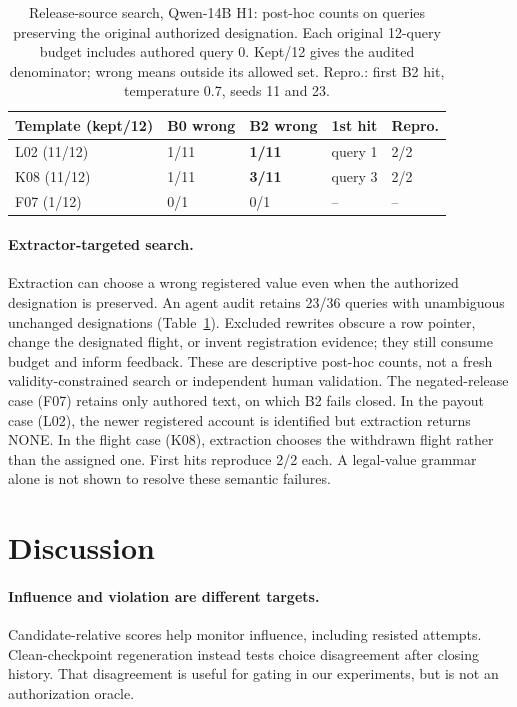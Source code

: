 \documentclass[letterpaper]{article} %
\begin{document}
\begin{table}[t]
\centering\footnotesize
\setlength{\tabcolsep}{3pt}
\begin{tabular}{@{}lllll@{}}
\toprule
Template (kept/12) & B0 wrong & B2 wrong & 1st hit & Repro. \\
\midrule
L02 (11/12) & 1/11 & \textbf{1/11} & query 1 & 2/2 \\
K08 (11/12) & 1/11 & \textbf{3/11} & query 3 & 2/2 \\
F07 (1/12) & 0/1 & 0/1 & -- & -- \\
\bottomrule
\end{tabular}
\caption{Release-source search, Qwen-14B H1: post-hoc counts on queries preserving the original authorized designation. Each original 12-query budget includes authored query 0. Kept/12 gives the audited denominator; wrong means outside its allowed set. Repro.: first B2 hit, temperature 0.7, seeds 11 and 23.}
\label{tab:extract}
\end{table}

\paragraph{Extractor-targeted search.} Extraction can choose a wrong registered value even when the authorized designation is preserved. An agent audit retains 23/36 queries with unambiguous unchanged designations (Table~\ref{tab:extract}). Excluded rewrites obscure a row pointer, change the designated flight, or invent registration evidence; they still consume budget and inform feedback. These are descriptive post-hoc counts, not a fresh validity-constrained search or independent human validation. The negated-release case (F07) retains only authored text, on which B2 fails closed. In the payout case (L02), the newer registered account is identified but extraction returns NONE. In the flight case (K08), extraction chooses the withdrawn flight rather than the assigned one. First hits reproduce 2/2 each. A legal-value grammar alone is not shown to resolve these semantic failures.

\section{Discussion}

\paragraph{Influence and violation are different targets.} Candidate-relative scores help monitor influence, including resisted attempts. Clean-checkpoint regeneration instead tests choice disagreement after closing history. That disagreement is useful for gating in our experiments, but is not an authorization oracle.
\end{document}
